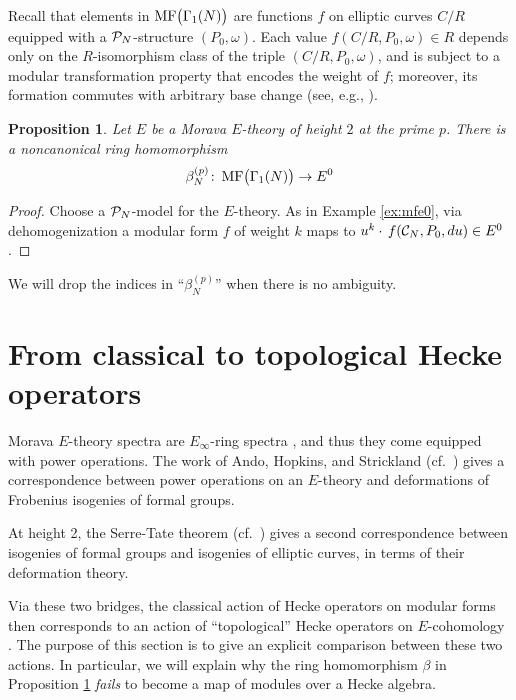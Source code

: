 \documentclass{gtpart}
\newtheorem{prop}[equation]{Proposition}
\theoremstyle{definition}
\theoremstyle{remark}
\def\co{\colon\thinspace}
\newcommand{\CC}{{\cal C}}
\newcommand{\CP}{{\cal P}}
\newcommand{\MF}{{\rm MF}}
\newcommand{\B}{\beta}
\newcommand{\G}{\Gamma}
\renewcommand{\=}{\approx}
\renewcommand{\-}{\sim}
\numberwithin{equation}{section}
\begin{document}
Recall that elements in $\MF\big(\G_1(N)\big)$ are functions $f$ on elliptic 
curves $C/R$ equipped with a $\CP_N$-structure $(P_0,\omega)$.  Each value 
$f(C/R, P_0, \omega) \in R$ depends only on the $R$-isomorphism class of the 
triple $(C/R, P_0, \omega)$, and is subject to a modular transformation property 
that encodes the weight of $f$; moreover, its formation commutes with arbitrary 
base change (see, e.g., \cite[Section 1.2]{padicprop}).  

\begin{prop}
 \label{prop:mfe0}
 Let $E$ be a Morava $E$-theory of height $2$ at the prime $p$.  There is a 
 noncanonical ring homomorphism 
 \[
  \B_N^{(p)} \co \MF\big(\G_1(N)\big) \to E^0 
 \]
\end{prop}

\begin{proof}
 Choose a $\CP_N$-model for the $E$-theory.  As in Example \ref{ex:mfe0}, via 
 dehomogenization a modular form $f$ of weight $k$ maps to 
 $u^k \cdot \, f(\CC_N, P_0, du) \in E^0$.  
\end{proof}

We will drop the indices in ``$\B_N^{(p)}$'' when there is no ambiguity.  



\section{From classical to topological Hecke operators}
\label{sec:ct}

Morava $E$-theory spectra are $E_\infty$-ring spectra \cite[Corollary 7.6]{GH}, 
and thus they come equipped with power operations.  The work of Ando, Hopkins, 
and Strickland \cite{AHS04} (cf.~\cite[Theorem B]{cong}) gives a correspondence 
between power operations on an $E$-theory and deformations of Frobenius 
isogenies of formal groups.  

At height 2, the Serre-Tate theorem \cite{LST} (cf.~\cite[Theorem 2.9.1]{KM}) 
gives a second correspondence between isogenies of formal groups and isogenies 
of elliptic curves, in terms of their deformation theory.  

Via these two bridges, the classical action of Hecke operators on modular forms 
then corresponds to an action of ``topological'' Hecke operators on 
$E$-cohomology \cite[Section 14]{log}.  The purpose of this section is to give 
an explicit comparison between these two actions.  In particular, we will 
explain why the ring homomorphism $\B$ in Proposition \ref{prop:mfe0} 
{\em fails} to become a map of modules over a Hecke algebra.  
\end{document}
